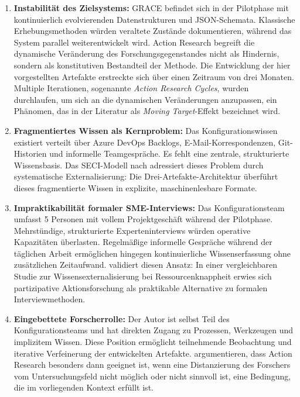 \begin{enumerate}
    \item \textbf{Instabilität des Zielsystems:} GRACE befindet sich in der Pilotphase mit kontinuierlich evolvierenden Datenstrukturen und JSON-Schemata. Klassische Erhebungsmethoden würden veraltete Zustände dokumentieren, während das System parallel weiterentwickelt wird. Action Research begreift die dynamische Veränderung des Forschungsgegenstandes nicht als Hindernis, sondern als konstitutiven Bestandteil der Methode. Die Entwicklung der hier vorgestellten Artefakte erstreckte sich über einen Zeitraum von drei Monaten. Multiple Iterationen, sogenannte \textit{Action Research Cycles}, wurden durchlaufen, um sich an die dynamischen Veränderungen anzupassen, ein Phänomen, das in der Literatur als \textit{Moving Target}-Effekt bezeichnet wird.

    \item \textbf{Fragmentiertes Wissen als Kernproblem:} Das Konfigurationswissen existiert verteilt über Azure DevOps Backlogs, E-Mail-Korrespondenzen, Git-Historien und informelle Teamgespräche. Es fehlt eine zentrale, strukturierte Wissensbasis. Das SECI-Modell nach \cite{nonaka:knowledge_creating_company1995} adressiert dieses Problem durch systematische Externalisierung: Die Drei-Artefakte-Architektur überführt dieses fragmentierte Wissen in explizite, maschinenlesbare Formate.

    \item \textbf{Impraktikabilität formaler SME-Interviews:} Das Konfigurationsteam umfasst 5 Personen mit vollem Projektgeschäft während der Pilotphase. Mehrstündige, strukturierte Experteninterviews würden operative Kapazitäten überlasten. Regelmäßige informelle Gespräche während der täglichen Arbeit ermöglichen hingegen kontinuierliche Wissenserfassung ohne zusätzlichen Zeitaufwand. \cite{jackson:par2010} validiert diesen Ansatz: In einer vergleichbaren Studie zur Wissensexternalisierung bei Ressourcenknappheit erwies sich partizipative Aktionsforschung als praktikable Alternative zu formalen Interviewmethoden.

    \item \textbf{Eingebettete Forscherrolle:} Der Autor ist selbst Teil des Konfigurationsteams und hat direkten Zugang zu Prozessen, Werkzeugen und implizitem Wissen. Diese Position ermöglicht teilnehmende Beobachtung und iterative Verfeinerung der entwickelten Artefakte. \cite{susman:action_research1983} argumentieren, dass Action Research besonders dann geeignet ist, wenn eine Distanzierung des Forschers vom Untersuchungsfeld nicht möglich oder nicht sinnvoll ist, eine Bedingung, die im vorliegenden Kontext erfüllt ist.
\end{enumerate}


